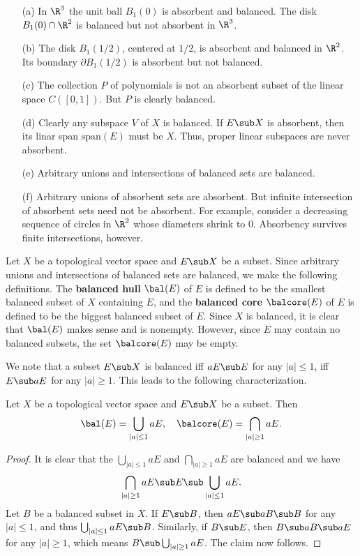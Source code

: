 \begin{example}
\mbox{}
\begin{itemize}
\item[(a)] In $\R^3$ the unit ball $B_1(0)$ is absorbent and balanced. The disk $B_1(0)\cap\R^2$ is balanced but not absorbent in $\R^3$.
\item[(b)] The disk $B_{1}(1/2)$, centered at $1/2$, is absorbent and balanced in $\R^2$. Its boundary $\partial B_1(1/2)$ is absorbent but not balanced.
\item[(c)] The collection $P$ of polynomials is not an absorbent subset of the linear space $C([0,1])$. But $P$ is clearly balanced.
\item[(d)] Clearly any subspace $V$ of $X$ is balanced. If $E\sub X$ is absorbent, then its linar span $\mathrm{span}(E)$ must be $X$. Thus, proper linear subspaces are never absorbent.
\item[(e)] Arbitrary unions and intersections of balanced sets are balanced.
\item[(f)] Arbitrary unions of absorbent sets are absorbent. But infinite intersection of absorbent sets need not be absorbent. For example, consider a decreasing sequence of circles in $\R^2$ whose diameters shrink to $0$. Absorbency survives finite intersections, however.
\end{itemize}
\end{example}
Let $X$ be a topological vector space and $E\sub X$ be a subset. Since arbitrary unions and intersections of balanced sets are balanced, we make the following definitions. The \textbf{balanced hull} $\bal(E)$ of $E$ is defined to be the smallest balanced subset of $X$ containing $E$, and the \textbf{balanced core} $\balcore(E)$ of $E$ is defined to be the biggest balanced subset of $E$. Since $X$ is balanced, it is clear that $\bal(E)$ makes sense and is nonempty. However, since $E$ may contain no balanced subsets, the set $\balcore(E)$ may be empty.\par
We note that a subset $E\sub X$ is balanced iff $aE\sub E$ for any $|a|\leq 1$, iff $E\sub aE$ for any $|a|\geq 1$. This leads to the following characterization.
\begin{proposition}\label{TVS balanced hull and core char}
Let $X$ be a topological vector space and $E\sub X$ be a subset. Then
\[\bal(E)=\bigcup_{|a|\leq 1}aE,\quad\balcore(E)=\bigcap_{|a|\geq 1}aE.\]
\end{proposition}
\begin{proof}
It is clear that the $\bigcup_{|a|\leq 1}aE$ and $\bigcap_{|a|\geq 1}aE$ are balanced and we have 
\[\bigcap_{|a|\geq 1}aE\sub E\sub\bigcup_{|a|\leq 1}aE.\]
Let $B$ be a balanced subset in $X$. If $E\sub B$, then $aE\sub aB\sub B$ for any $|a|\leq 1$, and thus $\bigcup_{|a|\leq 1}aE\sub B$. Similarly, if $B\sub E$, then $B\sub aB\sub aE$ for any $|a|\geq 1$, which means $B\sub\bigcup_{|a|\geq 1}aE$. The claim now follows.
\end{proof}
